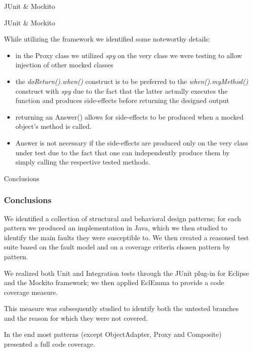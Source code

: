 \documentclass{beamer}
\begin{document}
\begin{section}{JUnit \& Mockito}
\begin{subsection}{JUnit \& Mockito}
\begin{frame}
{					While utilizing the framework we identified some noteworthy details:
					\begin{itemize}
						\item in the Proxy class we utilized \textit{spy} on the very class we were testing to allow injection of other mocked classes
						\item the \textit{doReturn().when()} construct is to be preferred to the \textit{when().myMethod()} construct with \textit{spy} due to the fact that the latter actually executes the function and produces side-effects before returning the designed output
						\item returning an Answer() allows for side-effects to be produced when a mocked object's method is called. 
						\item Answer is not necessary if the side-effects are produced only on the very class under test due to the fact that one can independently produce them by simply calling the respective tested methods.
					\end{itemize}}
				\end{frame}
				
			\end{subsection}
		\end{section}
		
		
		\begin{section}{}
			\begin{subsection}{Conclusions}
				\begin{frame}
					
					\frametitle{Conclusions}{\small 
						We identified a collection of structural and behavioral design patterns; for each pattern we produced an implementation in Java, which we then studied to identify the main faults they were susceptible to.
						We then created a reasoned test suite based on the fault model and on a coverage criteria chosen pattern by pattern.
						
						We realized both Unit and Integration tests through the JUnit plug-in for Eclipse and the Mockito framework; we then applied EclEmma to provide a code coverage measure.
						
						This measure was subsequently studied to identify both the untested branches and the reason for which they were not covered.
						
						In the end most patterns (except ObjectAdapter, Proxy and Composite) presented a full code coverage.
					}
				\end{frame}
			\end{subsection}
		\end{section}
\end{document}
